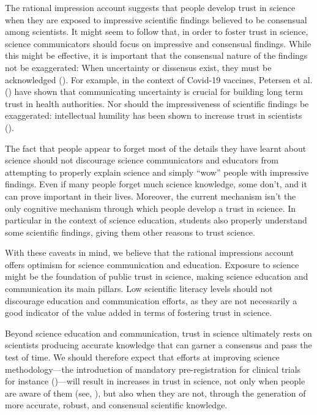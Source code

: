 \documentclass[
  man,
  floatsintext,
  longtable,
  nolmodern,
  notxfonts,
  notimes,
  colorlinks=true,linkcolor=blue,citecolor=blue,urlcolor=blue]{apa7}
\begin{document}
The rational impression account suggests that people develop trust in
science when they are exposed to impressive scientific findings believed
to be consensual among scientists. It might seem to follow that, in
order to foster trust in science, science communicators should focus on
impressive and consensual findings. While this might be effective, it is
important that the consensual nature of the findings not be exaggerated:
When uncertainty or dissensus exist, they must be acknowledged
(). For example, in the context of Covid-19 vaccines, Petersen et
al. ()
have shown that communicating uncertainty is crucial for building long
term trust in health authorities. Nor should the impressiveness of
scientific findings be exaggerated: intellectual humility has been shown
to increase trust in scientists
().

The fact that people appear to forget most of the details they have
learnt about science should not discourage science communicators and
educators from attempting to properly explain science and simply ``wow''
people with impressive findings. Even if many people forget much science
knowledge, some don't, and it can prove important in their lives.
Moreover, the current mechanism isn't the only cognitive mechanism
through which people develop a trust in science. In particular in the
context of science education, students also properly understand some
scientific findings, giving them other reasons to trust science.

With these caveats in mind, we believe that the rational impressions
account offers optimism for science communication and education.
Exposure to science might be the foundation of public trust in science,
making science education and communication its main pillars. Low
scientific literacy levels should not discourage education and
communication efforts, as they are not necessarily a good indicator of
the value added in terms of fostering trust in science.

Beyond science education and communication, trust in science ultimately
rests on scientists producing accurate knowledge that can garner a
consensus and pass the test of time. We should therefore expect that
efforts at improving science methodology---the introduction of mandatory
pre-registration for clinical trials for instance
()---will result in increases in trust in science, not only when
people are aware of them (see,
), but
also when they are not, through the generation of more accurate, robust,
and consensual scientific knowledge.
\end{document}

